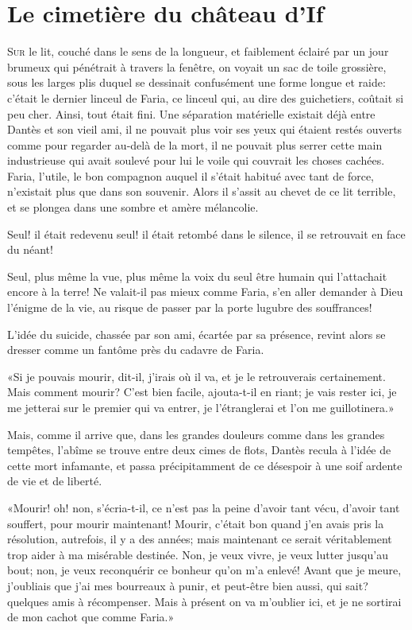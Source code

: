 \chapter{Le cimetière du château d'If}

\lettrine{S}{ur} le lit, couché dans le sens de la longueur, et faiblement éclairé par un jour brumeux qui pénétrait à travers la fenêtre, on voyait un sac de toile grossière, sous les larges plis duquel se dessinait confusément une forme longue et raide: c'était le dernier linceul de Faria, ce linceul qui, au dire des guichetiers, coûtait si peu cher. Ainsi, tout était fini. Une séparation matérielle existait déjà entre Dantès et son vieil ami, il ne pouvait plus voir ses yeux qui étaient restés ouverts comme pour regarder au-delà de la mort, il ne pouvait plus serrer cette main industrieuse qui avait soulevé pour lui le voile qui couvrait les choses cachées. Faria, l'utile, le bon compagnon auquel il s'était habitué avec tant de force, n'existait plus que dans son souvenir. Alors il s'assit au chevet de ce lit terrible, et se plongea dans une sombre et amère mélancolie.

Seul! il était redevenu seul! il était retombé dans le silence, il se retrouvait en face du néant!

Seul, plus même la vue, plus même la voix du seul être humain qui l'attachait encore à la terre! Ne valait-il pas mieux comme Faria, s'en aller demander à Dieu l'énigme de la vie, au risque de passer par la porte lugubre des souffrances!

L'idée du suicide, chassée par son ami, écartée par sa présence, revint alors se dresser comme un fantôme près du cadavre de Faria.

«Si je pouvais mourir, dit-il, j'irais où il va, et je le retrouverais certainement. Mais comment mourir? C'est bien facile, ajouta-t-il en riant; je vais rester ici, je me jetterai sur le premier qui va entrer, je l'étranglerai et l'on me guillotinera.»

Mais, comme il arrive que, dans les grandes douleurs comme dans les grandes tempêtes, l'abîme se trouve entre deux cimes de flots, Dantès recula à l'idée de cette mort infamante, et passa précipitamment de ce désespoir à une soif ardente de vie et de liberté.

«Mourir! oh! non, s'écria-t-il, ce n'est pas la peine d'avoir tant vécu, d'avoir tant souffert, pour mourir maintenant! Mourir, c'était bon quand j'en avais pris la résolution, autrefois, il y a des années; mais maintenant ce serait véritablement trop aider à ma misérable destinée. Non, je veux vivre, je veux lutter jusqu'au bout; non, je veux reconquérir ce bonheur qu'on m'a enlevé! Avant que je meure, j'oubliais que j'ai mes bourreaux à punir, et peut-être bien aussi, qui sait? quelques amis à récompenser. Mais à présent on va m'oublier ici, et je ne sortirai de mon cachot que comme Faria.»

